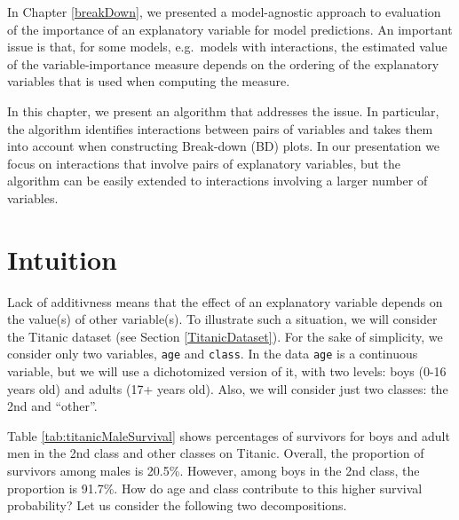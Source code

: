 \documentclass[]{krantz}
\begin{document}
In Chapter \ref{breakDown}, we presented a model-agnostic approach to evaluation of the importance of an explanatory variable for model predictions. An important issue is that, for some models, e.g.~models with interactions, the estimated value of the variable-importance measure depends on the ordering of the explanatory variables that is used when computing the measure.

In this chapter, we present an algorithm that addresses the issue. In particular, the algorithm identifies interactions between pairs of variables and takes them into account when constructing Break-down (BD) plots. In our presentation we focus on interactions that involve pairs of explanatory variables, but the algorithm can be easily extended to interactions involving a larger number of variables.

\hypertarget{iBDIntuition}{%
\section{Intuition}\label{iBDIntuition}}

Lack of additivness means that the effect of an explanatory variable depends on the value(s) of other variable(s). To illustrate such a situation, we will consider the Titanic dataset (see Section \ref{TitanicDataset}). For the sake of simplicity, we consider only two variables, \texttt{age} and \texttt{class}. In the data \texttt{age} is a continuous variable, but we will use a dichotomized version of it, with two levels: boys (0-16 years old) and adults (17+ years old). Also, we will consider just two classes: the 2nd and ``other''.

Table \ref{tab:titanicMaleSurvival} shows percentages of survivors for boys and adult men in the 2nd class and other classes on Titanic. Overall, the proportion of survivors among males is 20.5\%. However, among boys in the 2nd class, the proportion is 91.7\%. How do age and class contribute to this higher survival probability? Let us consider the following two decompositions.
\end{document}
